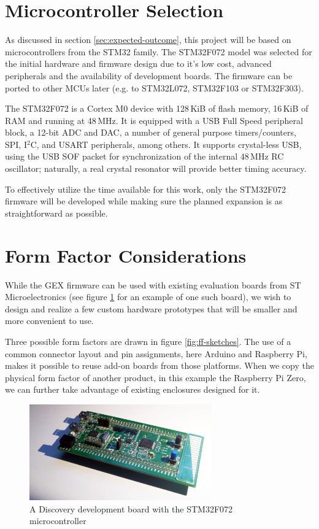 \section{Microcontroller Selection}

As discussed in section \ref{sec:expected-outcome}, this project will be based on microcontrollers from the STM32 family. The STM32F072 model was selected for the initial hardware and firmware design due to it's low cost, advanced peripherals and the availability of development boards. The firmware can be ported to other MCUs later (e.g. to STM32L072, STM32F103 or STM32F303).

The STM32F072 is a Cortex M0 device with 128\,KiB of flash memory, 16\,KiB of RAM and running at 48\,MHz. It is equipped with a USB Full Speed peripheral block, a 12-bit ADC and DAC, a number of general purpose timers/counters, SPI, I$^2$C, and USART peripherals, among others. It supports crystal-less USB, using the USB SOF packet for synchronization of the internal 48\,MHz RC oscillator; naturally, a real crystal resonator will provide better timing accuracy.

To effectively utilize the time available for this work, only the STM32F072 firmware will be developed while making sure the planned expansion is as straightforward as possible.

\section{Form Factor Considerations}

While the GEX firmware can be used with existing evaluation boards from ST Microelectronics (see figure \ref{fig:discovery} for an example of one such board), we wish to design and realize a few custom hardware prototypes that will be smaller and more convenient to use. 

Three possible form factors are drawn in figure \ref{fig:ff-sketches}. The use of a common connector layout and pin assignments, here Arduino and Raspberry Pi, makes it possible to reuse add-on boards from those platforms. When we copy the physical form factor of another product, in this example the Raspberry Pi Zero, we can further take advantage of existing enclosures designed for it.

\begin{figure}
	\centering
	\includegraphics[width=0.7\textwidth] {img/disco072.jpg}
	\caption[A Discovery board with STM32F072]{\label{fig:discovery}A Discovery development board with the STM32F072 microcontroller}
\end{figure}

